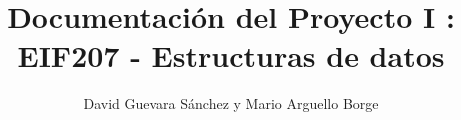\documentclass[a4paper, man, floatsintext]{apa6}
\title{Documentación del Proyecto I : EIF207 - Estructuras de datos}
\author{David Guevara Sánchez y Mario Arguello Borge}
\affiliation{Universidad Nacional}
\begin{document}
\thispagestyle{otherpage}
\maketitle
\tableofcontents
\newpage

\begin{appendix}
	\listoffigures
\end{appendix}
\end{document}
